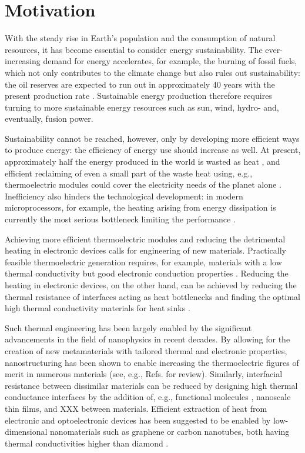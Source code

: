 
\section{Motivation}


With the steady rise in Earth's population and the consumption of natural resources, it has become essential to consider energy sustainability. The ever-increasing demand for energy accelerates, for example, the burning of fossil fuels, which not only contributes to the climate change but also rules out sustainability: the oil reserves are expected to run out in approximately 40 years with the present production rate \cite{}. Sustainable energy production therefore requires turning to more sustainable energy resources such as sun, wind, hydro- and, eventually, fusion power.

Sustainability cannot be reached, however, only by developing more efficient ways to produce energy: the efficiency of energy use should increase as well. At present, approximately half the energy produced in the world is wasted as heat \cite{}, and efficient reclaiming of even a small part of the waste heat using, e.g., thermoelectric modules could cover the electricity needs of the planet alone \cite{}. Inefficiency also hinders the technological development: in modern microprocessors, for example, the heating arising from energy dissipation is currently the most serious bottleneck limiting the performance \cite{}. 

Achieving more efficient thermoelectric modules and reducing the detrimental heating in electronic devices calls for engineering of new materials. Practically feasible thermoelectric generation requires, for example, materials with a low thermal conductivity but good electronic conduction properties \cite{chen}. Reducing the heating in electronic devices, on the other hand, can be achieved by reducing the thermal resistance of interfaces acting as heat bottlenecks and finding the optimal high thermal conductivity materials for heat sinks \cite{pop10}. 

Such thermal engineering has been largely enabled by the significant advancements in the field of nanophysics in recent decades. By allowing for the creation of new metamaterials with tailored thermal and electronic properties, nanostructuring has been shown to enable increasing the thermoelectric figures of merit in numerous materials (see, e.g., Refs. \cite{vineis10,kanatzidis10,shakouri11} for review). Similarly, interfacial resistance between dissimilar materials can be reduced by designing high thermal conductance interfaces by the addition of, e.g., functional molecules \cite{hopkins11,kaur14}, nanoscale thin films, and XXX between materials. Efficient extraction of heat from electronic and optoelectronic devices has been suggested \cite{ghosh08,yan12} to be enabled by low-dimensional nanomaterials such as graphene or carbon nanotubes, both having thermal conductivities higher than diamond \cite{balandin11}. 

